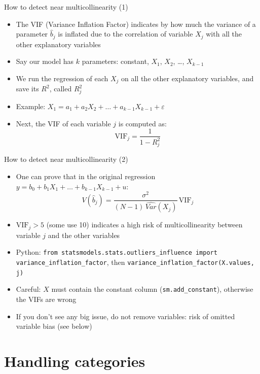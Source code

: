 \documentclass[aspectratio=169]{beamer}
\begin{document}
\begin{frame}{How to detect near multicollinearity (1)}
\begin{itemize}
    \item The VIF (Variance Inflation Factor) indicates by how much the variance of a parameter $\hat{b}_j$ is inflated due to the correlation of variable $X_j$ with all the other explanatory variables
    \item Say our model has $k$ parameters: constant, $X_1$, $X_2$, \dots, $X_{k-1}$
    \item We run the regression of each $X_j$ on all the other explanatory variables, and save its $R^2$, called $R_j^2$
    \item Example: $X_1 = a_1 + a_2X_2 + \dots + a_{k-1}X_{k-1} + \varepsilon$
    \item Next, the VIF of each variable $j$ is computed as:
    \[
    \text{VIF}_j = \frac{1}{1-R_j^2}
    \]
\end{itemize}
\end{frame}

\begin{frame}{How to detect near multicollinearity (2)}
\begin{itemize}
    \item One can prove that in the original regression $y = b_0 + b_1X_1 + \dots + b_{k-1}X_{k-1} + u$:
    \[
    V(\hat{b}_j) = \frac{\sigma^2}{(N-1)\,\widehat{Var}(X_j)} \, \text{VIF}_j
    \]
    \item $\text{VIF}_j > 5$ (some use 10) indicates a high risk of multicollinearity between variable $j$ and the other variables
    \item Python: \texttt{from statsmodels.stats.outliers\_influence import variance\_inflation\_factor}, then \texttt{variance\_inflation\_factor(X.values, j)}
    \item Careful: $X$ must contain the constant column (\texttt{sm.add\_constant}), otherwise the VIFs are wrong
    \item If you don't see any big issue, do not remove variables: risk of omitted variable bias (see below)
\end{itemize}
\end{frame}

\section{Handling categories}
\end{document}
